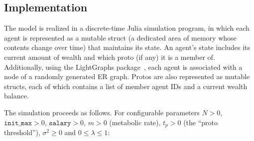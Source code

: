 \documentclass[sigconf]{acmart}
\begin{document}
\subsection{Implementation}


The model is realized in a discrete-time Julia simulation program, in which each agent is represented as a mutable struct (a dedicated area of memory whose contents change over time) that maintains its state. An agent's state includes its current amount of wealth and which proto (if any) it is a member of. Additionally, using the LightGraphs package~\cite{LightGraphs-2017}, each agent is associated with a node of a randomly generated ER graph. Protos are also represented as mutable structs, each of which contains a list of member agent IDs and a current wealth balance.

The simulation proceeds as follows. For configurable parameters
$N > 0$,
$\texttt{init\_max} > 0$,
$\texttt{salary} > 0$,
$m > 0$ (metabolic rate),
$t_p > 0$ (the ``proto threshold''),
$\sigma^2 \ge 0$ and
$0 \le \lambda \le 1$:
\end{document}
